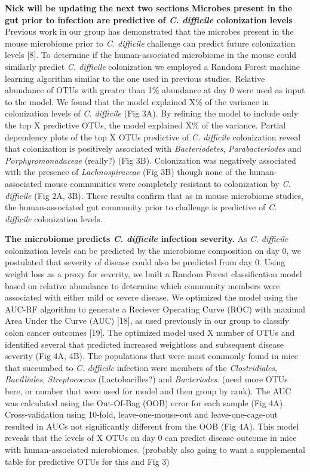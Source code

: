\documentclass[11pt,]{article}
\begin{document}
\textbf{Nick will be updating the next two sections} \textbf{Microbes
present in the gut prior to infection are predictive of \emph{C.
difficile} colonization levels} Previous work in our group has
demonstrated that the microbes present in the mouse microbiome prior to
\emph{C. difficile} challenge can predict future colonization levels
{[}8{]}. To determine if the human-associated microbiome in the mouse
could similarly predict \emph{C. difficile} colonization we employed a
Random Forest machine learning algorithm similar to the one used in
previous studies. Relative abundance of OTUs with greater than 1\%
abundance at day 0 were used as input to the model. We found that the
model explained X\% of the variance in colonization levels of \emph{C.
difficile} (Fig 3A). By refining the model to include only the top X
predictive OTUs, the model explained X\% of the variance. Partial
dependency plots of the top X OTUs predictive of \emph{C. difficile}
colonization reveal that colonization is positively associated with
\emph{Bacteriodetes}, \emph{Parabacteriodes} and
\emph{Porphyromonadaceae} (really?) (Fig 3B). Colonization was
negatively associated with the presence of \emph{Lachnospiraceae} (Fig
3B) though none of the human-associated mouse communities were
completely resistant to colonization by \emph{C. difficile} (Fig 2A,
3B). These results confirm that as in mouse microbiome studies, the
human-associated gut community prior to challenge is predictive of
\emph{C. difficile} colonization levels.

\textbf{The microbiome predicts \emph{C. difficile} infection severity.}
As \emph{C. difficile} colonization levels can be predicted by the
microbiome composition on day 0, we postulated that severity of disease
could also be predicted from day 0. Using weight loss as a proxy for
severity, we built a Random Forest classification model based on
relative abundance to determine which community members were associated
with either mild or severe disease. We optimized the model using the
AUC-RF algorithm to generate a Reciever Operating Curve (ROC) with
maximal Area Under the Curve (AUC) {[}18{]}, as used previously in our
group to classify colon cancer outcomes {[}19{]}. The optimized model
used X number of OTUs and identified several that predicted increased
weightloss and subsequent disease severity (Fig 4A, 4B). The populations
that were most commonly found in mice that succumbed to \emph{C.
difficile} infection were members of the \emph{Clostridiales},
\emph{Bacilliales}, \emph{Streptococcus} (Lactobacilles?) and
\emph{Bacteriodes}. (need more OTUs here, or number that were used for
model and then group by rank). The AUC was calculated using the
Out-Of-Bag (OOB) error for each sample (Fig 4A). Cross-validation using
10-fold, leave-one-mouse-out and leave-one-cage-out resulted in AUCs not
significantly different from the OOB (Fig 4A). This model reveals that
the levels of X OTUs on day 0 can predict disease outcome in mice with
human-associated microbiomes. (probably also going to want a
supplemental table for predictive OTUs for this and Fig 3)
\end{document}
